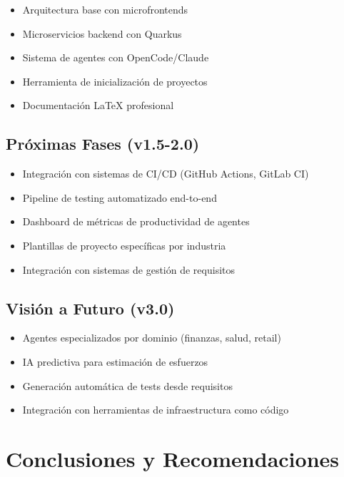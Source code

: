 \documentclass[12pt,a4paper,spanish]{article}
\begin{document}
\begin{itemize}
    \item[✓] Arquitectura base con microfrontends
    \item[✓] Microservicios backend con Quarkus
    \item[✓] Sistema de agentes con OpenCode/Claude
    \item[✓] Herramienta de inicialización de proyectos
    \item[✓] Documentación LaTeX profesional
\end{itemize}

\subsection{Próximas Fases (v1.5-2.0)}

\begin{itemize}
    \item[ ] Integración con sistemas de CI/CD (GitHub Actions, GitLab CI)
    \item[ ] Pipeline de testing automatizado end-to-end
    \item[ ] Dashboard de métricas de productividad de agentes
    \item[ ] Plantillas de proyecto específicas por industria
    \item[ ] Integración con sistemas de gestión de requisitos
\end{itemize}

\subsection{Visión a Futuro (v3.0)}

\begin{itemize}
    \item[ ] Agentes especializados por dominio (finanzas, salud, retail)
    \item[ ] IA predictiva para estimación de esfuerzos
    \item[ ] Generación automática de tests desde requisitos
    \item[ ] Integración con herramientas de infraestructura como código
\end{itemize}

\newpage

\section{Conclusiones y Recomendaciones}
\end{document}
